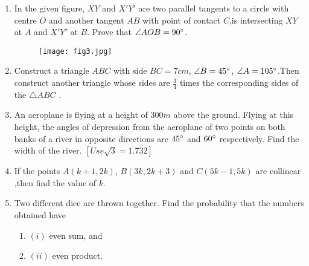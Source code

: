 \documentclass{article}
\providecommand{\brak}[1]{\ensuremath{\left(#1\right)}}
\providecommand{\sbrak}[1]{\ensuremath{\left[#1\right]}}
\begin{document}
\begin{enumerate}
																																																								     \item In the given figure, $XY$ and $X'Y'$ are two parallel tangents to a circle with centre $O$ and another tangent $AB$ with point of contact $C$,is intersecting $XY$ at $A$ and $X'Y'$ at $B$. Prove that $\angle AOB = 90\degree$.
																																																									         \begin{figure}[h]
																																																											         \centering
																																																												         \texttt{[image: fig3.jpg]}
																																																													     \end{figure}
																																																													         
																																																														     \item Construct a triangle $ABC$ with side $BC = 7 cm$, $\angle B = 45\degree$, $\angle A = 105\degree$.Then construct another triangle whose sides are $\frac{3}{4}$ times the corresponding sides of the $\triangle ABC$ .
																																																															         
																																																															         \item An aeroplane is flying at a height of $300 m$ above the ground. Flying at this height, the angles of depression from the aeroplane of two points on both banks of a river in opposite directions are $45\degree$ and $60\degree$ respectively. Find the width of the river. $\sbrak{Use \sqrt 3 = 1.732}$
																																																																	     
																																																																	     \item If the points $A\brak{k + 1, 2k}$, $B\brak{3k, 2k + 3}$ and $C\brak{5k - 1, 5k}$ are collinear ,then find the value of $k$.
																																																																		         
																																																																		         \item Two different dice are thrown together. Find the probability that the numbers obtained have
																																																																				     \begin{enumerate}
																																																																						             \item \brak{i} even sum, and
																																																																								             \item \brak{ii} even product.
																																																																										         \end{enumerate}
																																																																											     

\end{enumerate}
\end{document}
